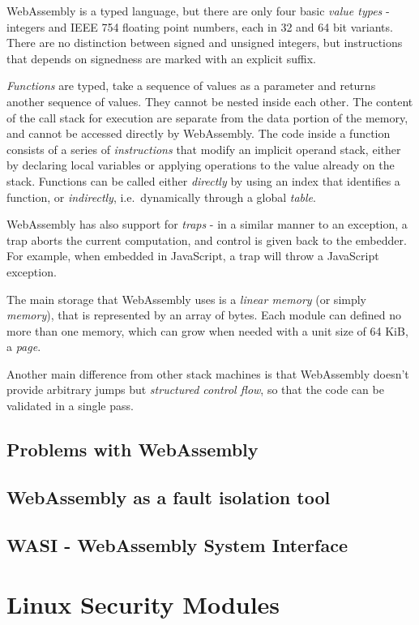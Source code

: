 WebAssembly is a typed language, but there are only four basic \textit{value types} - integers and IEEE 754 floating
point numbers, each in 32 and 64 bit variants. There are no distinction between signed and unsigned integers,
but instructions that depends on signedness are marked with an explicit suffix.

\textit{Functions} are typed, take a sequence of values as a parameter and returns another sequence of values.
They cannot be nested inside each other. The content of the call stack for execution are separate from the data
portion of the memory, and cannot be accessed directly by WebAssembly.
The code inside a function consists of a series of \textit{instructions} that modify an implicit operand stack,
either by declaring local variables or applying operations to the value already on the stack.
Functions can be called either \textit{directly} by using an index that identifies a function, or \textit{indirectly},
i.e.\ dynamically through a global \textit{table}.

WebAssembly has also support for \textit{traps} - in a similar manner to an exception, a trap aborts the current
computation, and control is given back to the embedder. For example, when embedded in JavaScript, a trap will
throw a JavaScript exception.

The main storage that WebAssembly uses is a \textit{linear memory} (or simply \textit{memory}), that is represented
by an array of bytes. Each module can defined no more than one memory, which can grow when needed with a unit size
of 64 KiB, a \textit{page}.

Another main difference from other stack machines is that WebAssembly doesn't provide arbitrary jumps but
\textit{structured control flow}, so that the code can be validated in a single pass.

\subsection{Problems with WebAssembly}
\subsection{WebAssembly as a fault isolation tool}
\subsection{WASI - WebAssembly System Interface}
\label{sec:introduction-wasi}

\section{Linux Security Modules}

